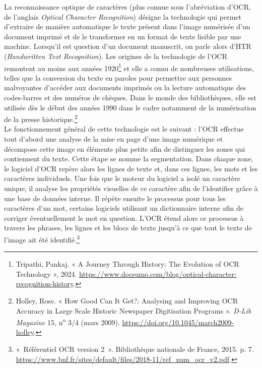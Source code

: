 \documentclass[a4paper,12pt,twoside]{book}
\begin{document}
La reconnaissance optique de caractères (plus connue sous l'abréviation
d'OCR, de l'anglais \emph{Optical Character Recognition}) désigne la
technologie qui permet d'extraire de manière automatique le texte
présent dans l'image numérisée d'un document imprimé et de le
transformer en un format de texte lisible par une machine. Lorsqu'il est
question d'un document manuscrit, on parle alors d'HTR
(\emph{Handwritten Text Recognition}). Les origines de la technologie de
l'OCR remontent au moins aux années 1920\footnote{Tripathi, Pankaj. « A
	Journey Through History: The Evolution of OCR Technology », 2024.
	\url{https://www.docsumo.com/blog/optical-character-recognition-history}.}
et elle a connu de nombreuses utilisations, telles que la conversion du
texte en paroles pour permettre aux personnes malvoyantes d'accéder aux
documents imprimés ou la lecture automatique des codes-barres et des
numéros de chèques. Dans le monde des bibliothèques, elle est utilisée
dès le début des années 1990 dans le cadre notamment de la numérisation
de la presse historique.\footnote{Holley, Rose. « How Good Can It Get?:
	Analysing and Improving OCR Accuracy in Large Scale Historic Newspaper
	Digitisation Programs ». \emph{D-Lib Magazine} 15,
	n\textsuperscript{o} 3/4 (mars 2009).
	\url{https://doi.org/10.1045/march2009-holley}.} \\

Le fonctionnement général de cette technologie est le suivant : l'OCR
effectue tout d'abord une analyse de la mise en page d'une image
numérique et décompose cette image en éléments plus petits afin de
distinguer les zones qui contiennent du texte. Cette étape se nomme la
segmentation. Dans chaque zone, le logiciel d'OCR repère alors les
lignes de texte et, dans ces lignes, les mots et les caractères
individuels. Une fois que le moteur du logiciel a isolé un caractère
unique, il analyse les propriétés visuelles de ce caractère afin de
l'identifier grâce à une base de données interne. Il répète ensuite le
processus pour tous les caractères d'un mot, certains logiciels
utilisant un dictionnaire interne afin de corriger éventuellement le mot
en question. L'OCR étend alors ce processus à travers les phrases, les
lignes et les blocs de texte jusqu'à ce que tout le texte de l'image ait
été identifié.\footnote{«~Référentiel OCR version 2~». Bibliothèque
	nationale de France, 2015. p. 7.
	\url{https://www.bnf.fr/sites/default/files/2018-11/ref_num_ocr_v2.pdf}.} \\
\end{document}
